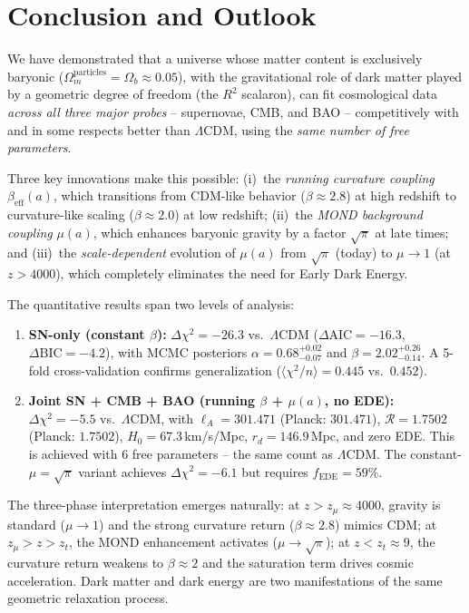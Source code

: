 \documentclass[aps,prd,twocolumn,superscriptaddress,nofootinbib,floatfix]{revtex4-2}
\begin{document}
\section{Conclusion and Outlook}
\label{sec:conclusion}

We have demonstrated that a universe whose matter content is exclusively baryonic ($\Omega_m^{\mathrm{particles}} = \Omega_b \approx 0.05$), with the gravitational role of dark matter played by a geometric degree of freedom (the $R^2$ scalaron), can fit cosmological data \textit{across all three major probes} -- supernovae, CMB, and BAO -- competitively with and in some respects better than $\Lambda$CDM, using the \textit{same number of free parameters}.

Three key innovations make this possible: (i)~the \textit{running curvature coupling} $\beta_{\mathrm{eff}}(a)$, which transitions from CDM-like behavior ($\beta \approx 2.8$) at high redshift to curvature-like scaling ($\beta \approx 2.0$) at low redshift; (ii)~the \textit{MOND background coupling} $\mu(a)$, which enhances baryonic gravity by a factor $\sqrt{\pi}$ at late times; and (iii)~the \textit{scale-dependent} evolution of $\mu(a)$ from $\sqrt{\pi}$ (today) to $\mu \to 1$ (at $z > 4000$), which completely eliminates the need for Early Dark Energy.

The quantitative results span two levels of analysis:
\begin{enumerate}
\item \textbf{SN-only (constant $\beta$):} $\Delta\chi^2 = -26.3$ vs.\ $\Lambda$CDM ($\Delta\mathrm{AIC} = -16.3$, $\Delta\mathrm{BIC} = -4.2$), with MCMC posteriors $\alpha = 0.68^{+0.02}_{-0.07}$ and $\beta = 2.02^{+0.26}_{-0.14}$. A 5-fold cross-validation confirms generalization ($\langle\chi^2/n\rangle = 0.445$ vs.\ $0.452$).

\item \textbf{Joint SN + CMB + BAO (running $\beta$ + $\mu(a)$, no EDE):} $\Delta\chi^2 = -5.5$ vs.\ $\Lambda$CDM, with $\ell_A = 301.471$ (Planck: $301.471$), $\mathcal{R} = 1.7502$ (Planck: $1.7502$), $H_0 = 67.3$\,km/s/Mpc, $r_d = 146.9$\,Mpc, and zero EDE. This is achieved with 6 free parameters -- the same count as $\Lambda$CDM. The constant-$\mu = \sqrt{\pi}$ variant achieves $\Delta\chi^2 = -6.1$ but requires $f_{\mathrm{EDE}} = 59\%$.
\end{enumerate}

The three-phase interpretation emerges naturally: at $z > z_\mu \approx 4000$, gravity is standard ($\mu \to 1$) and the strong curvature return ($\beta \approx 2.8$) mimics CDM; at $z_\mu > z > z_t$, the MOND enhancement activates ($\mu \to \sqrt{\pi}$); at $z < z_t \approx 9$, the curvature return weakens to $\beta \approx 2$ and the saturation term drives cosmic acceleration. Dark matter and dark energy are two manifestations of the same geometric relaxation process.
\end{document}
